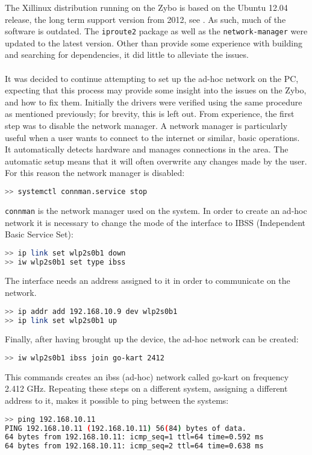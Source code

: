 The Xillinux distribution running on the Zybo is based on the Ubuntu 12.04 release, the long term support version from 2012, see \cite{xillinux}.
As such, much of the software is outdated.
The \texttt{iproute2} package as well as the \texttt{network-manager} were updated to the latest version.
Other than provide some experience with building and searching for dependencies, it did little to alleviate the issues.
\\~\\
It was decided to continue attempting to set up the ad-hoc network on the PC, expecting that this process may provide some insight into the issues on the Zybo, and how to fix them.
Initially the drivers were verified using the same procedure as mentioned previously; for brevity, this is left out.
From experience, the first step was to disable the network manager.
A network manager is particularly useful when a user wants to connect to the internet or similar, basic operations.
It automatically detects hardware and manages connections in the area.
The automatic setup means that it will often overwrite any changes made by the user.
For this reason the network manager is disabled:
\begin{lstlisting}[language=bash]
>> systemctl connman.service stop
\end{lstlisting}
\texttt{connman} is the network manager used on the system.
In order to create an ad-hoc network it is necessary to change the mode of the interface to IBSS (Independent Basic Service Set):
\begin{lstlisting}[language=bash]
>> ip link set wlp2s0b1 down
>> iw wlp2s0b1 set type ibss
\end{lstlisting}
The interface needs an address assigned to it in order to communicate on the network.
\begin{lstlisting}[language=bash]
>> ip addr add 192.168.10.9 dev wlp2s0b1
>> ip link set wlp2s0b1 up
\end{lstlisting}
Finally, after having brought up the device, the ad-hoc network can be created:
\begin{lstlisting}[language=bash]
>> iw wlp2s0b1 ibss join go-kart 2412
\end{lstlisting}
This commands creates an ibss (ad-hoc) network called go-kart on frequency 2.412 \si{\giga\hertz}.
Repeating these steps on a different system, assigning a different address to it, makes it possible to ping between the systems: 
\begin{lstlisting}[language=bash]
>> ping 192.168.10.11
PING 192.168.10.11 (192.168.10.11) 56(84) bytes of data.
64 bytes from 192.168.10.11: icmp_seq=1 ttl=64 time=0.592 ms
64 bytes from 192.168.10.11: icmp_seq=2 ttl=64 time=0.638 ms
\end{lstlisting}

